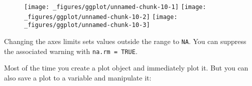 \begin{Shaded}
\begin{Highlighting}[]
\StringTok{  }\NormalTok{(} \NormalTok{)}

\StringTok{  }\NormalTok{(} \NormalTok{) +}\StringTok{ }
\StringTok{  }\NormalTok{(}\NormalTok{, }\NormalTok{) +}\StringTok{ }
\StringTok{  }\NormalTok{(}\NormalTok{, }\NormalTok{)}
  
\StringTok{  }\NormalTok{(} \NormalTok{, } \NormalTok{) +}\StringTok{ }
\StringTok{  }\NormalTok{(}\NormalTok{, }\NormalTok{)}
\end{Highlighting}
\end{Shaded}

\begin{figure}[H]
  \texttt{[image: \_figures/ggplot/unnamed-chunk-10-1]}%
  \texttt{[image: \_figures/ggplot/unnamed-chunk-10-2]}%
  \texttt{[image: \_figures/ggplot/unnamed-chunk-10-3]}
\end{figure}

Changing the axes limits sets values outside the range to \texttt{NA}.
You can suppress the associated warning with \texttt{na.rm = TRUE}.


Most of the time you create a plot object and immediately plot it. But
you can also save a plot to a variable and manipulate it:

\begin{Shaded}
\begin{Highlighting}[]
\StringTok{ } 
\StringTok{  }\NormalTok{()}
\end{Highlighting}
\end{Shaded}

